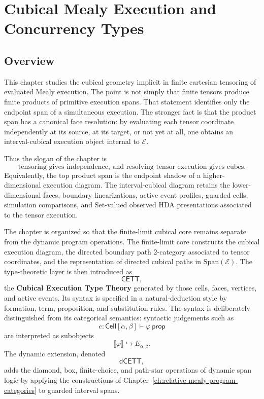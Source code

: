 \chapter{Cubical Mealy Execution and Concurrency Types}
\label{ch:cubical-mealy-execution-concurrency-types}

\section{Overview}
\label{sec:cmett-overview}

This chapter studies the cubical geometry implicit in finite cartesian tensoring
of evaluated Mealy execution. The point is not simply that finite tensors
produce finite products of primitive execution spans. That statement
identifies only the endpoint span of a simultaneous execution. The stronger
fact is that the product span has a canonical face resolution: by evaluating
each tensor coordinate independently at its source, at its target, or not yet
at all, one obtains an interval-cubical execution object internal to
\(\mathcal E\).

Thus the slogan of the chapter is
\[
    \text{tensoring gives independence, and resolving tensor execution gives cubes.}
\]
Equivalently, the top product span is the endpoint shadow of a
higher-dimensional execution diagram. The interval-cubical diagram retains
the lower-dimensional faces, boundary linearizations, active event profiles,
guarded cells, simulation comparisons, and Set-valued observed HDA
presentations associated to the tensor execution.

The chapter is organized so that the finite-limit cubical core remains
separate from the dynamic program operations. The finite-limit core constructs
the cubical execution diagram, the directed boundary path 2-category associated
to tensor coordinates, and the representation of directed cubical paths in
\(\mathrm{Span}(\mathcal E)\). The type-theoretic layer is then introduced as
\[
    \mathsf{CETT},
\]
the \textbf{Cubical Execution Type Theory} generated by those cells, faces,
vertices, and active events. Its syntax is specified in a natural-deduction
style by formation, term, proposition, and substitution rules. The syntax is
deliberately distinguished from its categorical semantics: syntactic judgements
such as
\[
    e:\mathsf{Cell}[\alpha,\beta]\vdash \varphi\ \mathsf{prop}
\]
are interpreted as subobjects
\[
    \llbracket \varphi\rrbracket\hookrightarrow E_{\alpha,\beta}.
\]
The dynamic extension, denoted
\[
    \mathsf{dCETT},
\]
adds the diamond, box, finite-choice, and path-star operations of dynamic span
logic by applying the constructions of
Chapter~\ref{ch:relative-mealy-program-categories} to guarded interval
spans.

